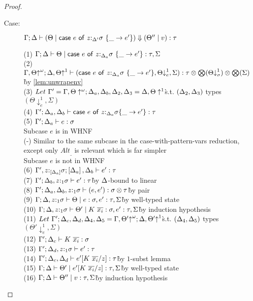 \documentclass[acmsmall,review,anonymous,screen]{acmart}
\newcommand{\ccase}[2]{\mathsf{case}~#1~\mathsf{of}~#2}
\begin{document}
\begin{proof}
\begin{description}
\begin{tabbing}
\end{tabbing}
\item[Case:] $\Gamma; \Delta \vdash (\Theta \mid \ccase{e}{z{:}_{\Delta'}\s~\{\_ \to e'}\}) \Downarrow (\Theta'' \mid v) : \tau$
\begin{tabbing}
    (1) $\Gamma; \Delta \vdash \Theta \mid \ccase{e}{z{:}_{\Delta_a}\s~\{\_ \to e'}\} : \tau, \Sigma$\\
    (2) $\G, \Theta{\uparrow}^\omega; \D, \Theta{\uparrow}^1 \vdash (\ccase{e}{z{:}_{\Delta_a}\s~\{\_ \to e'}\}, \Theta{\downarrow}^1_e, \Sigma) : \tau \otimes \bigotimes(\Theta{\downarrow}^1_\sigma) \otimes \bigotimes(\Sigma)$\`by \ref{lem:unwrapenv}\\
    (3) $Let~\Gamma' = \Gamma, \Theta\uparrow^\omega; \Delta_a,\Delta_b,\Delta_2,\Delta_3 = \Delta,\Theta\uparrow^1$\`s.t. $(\Delta_2,\Delta_3)$ types $(\Theta\downarrow^1_e, \Sigma)$\\
    (4) $\G'; \D_a, \D_b \vdash \ccase{e}{z{:}_{\D_a}\s\{\_ \to e'\}} : \tau$\\
    (5) $\Gamma'; \Delta_a \vdash e : \sigma$\\
    Subcase $e$ is in WHNF\\
    (-) Similar to the same subcase in the case-with-pattern-vars reduction,\\
        except only $Alt_{\_}$ is relevant which is far simpler\\
    Subcase $e$ is not in WHNF\\
    (6) $\Gamma', z{:}_{\left[\Delta_a\right]}\sigma; \left[\Delta_a\right], \Delta_b \vdash e' : \tau$\\
    (7) $\Gamma'; \Delta_b, z{:}_1\sigma \vdash e' : \tau$\` by $\Delta$-bound to linear\\
    (8) $\Gamma'; \Delta_a, \Delta_b, z{:}_1\sigma \vdash (e, e') : \sigma \otimes \tau$\` by pair\\
    (9) $\Gamma; \Delta, z{:}_1\sigma \vdash \Theta \mid e : \sigma, e' : \tau,
    \Sigma$\` by well-typed state\\
    (10) $\Gamma; \Delta, z{:}_1\sigma \vdash \Theta' \mid K~\overline{x_i} : \sigma, e' : \tau, \Sigma$\` by induction hypothesis\\
    (11) $Let~\Gamma';\Delta_c,\Delta_d,\Delta_4,\Delta_5 = \Gamma, \Theta'{\uparrow}^\omega; \Delta, \Theta'{\uparrow}^1$\`s.t. $(\Delta_4,\Delta_5)$ types $(\Theta'{\downarrow}^1_e, \Sigma)$\\
    (12) $\Gamma';\Delta_c \vdash K~\overline{x_i} : \sigma$\\
    (13) $\Gamma';\Delta_d,z{:}_1\sigma \vdash e' : \tau$\\
    (14) $\Gamma';\Delta_c, \Delta_d \vdash e'[K~\overline{x_i}/z] : \tau$\` by $1$-subst lemma\\
    (15) $\Gamma;\Delta \vdash \Theta' \mid e'[K~\overline{x_i}/z] : \tau, \Sigma$\` by well-typed state\\
    (16) $\Gamma;\Delta \vdash \Theta'' \mid v : \tau, \Sigma$\` by induction hypothesis\\
\end{tabbing}
\end{description}
\end{proof}
\end{document}

